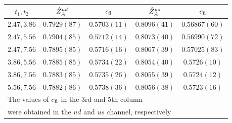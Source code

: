 \topinsert
{}
\vspace{-0.6em}
\begin{center}
\renewcommand{\arraystretch}{1.25}
\begin{tabular}{ccccc}
\hline\hline
$t_1,t_2$ & $\hat{Z}_A^{ud}$ & $c_{\rm fl}$ & $\hat{Z}_A^{us}$ & $c_{\rm fl}$ \\
\hline
$2.47,3.86$ & $0.7929(87)$ & $0.5703(11)$  & $0.8096(41)$ & $0.56867(60)$ \\
$2.47,5.56$ & $0.7904(85)$ & $0.5712(14)$  & $0.8073(40)$ & $0.56990(72)$ \\
$2.47,7.56$ & $0.7895(85)$ & $0.5716(16)$  & $0.8067(39)$ & $0.57025(83)$ \\
$3.86,5.56$ & $0.7885(85)$ & $0.5734(22)$  & $0.8054(40)$ & $0.5726(10)$  \\
$3.86,7.56$ & $0.7883(85)$ & $0.5735(26)$  & $0.8055(39)$ & $0.5724(12)$  \\
$5.56,7.56$ & $0.7882(86)$ & $0.5738(36)$  & $0.8056(38)$ & $0.5723(16)$  \\
\hline\hline
\multicolumn{5}{l}{\footnotesize The values of $c_{\rm fl}$ in the 3rd and 5th column}\\[-3pt]
\multicolumn{5}{l}{\footnotesize were obtained in the $ud$ and $us$ channel, respectively}\\
\end{tabular}
\end{center}
\endinsert
